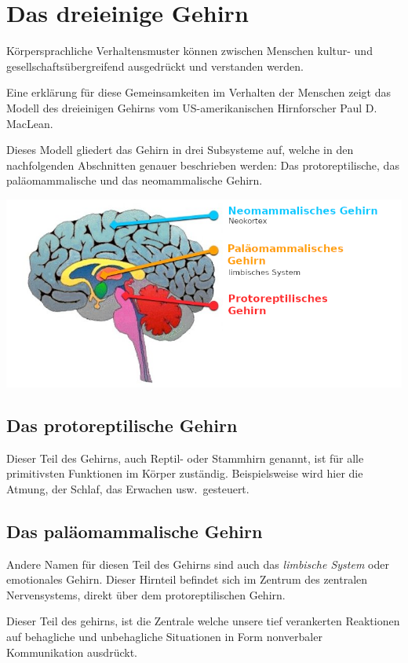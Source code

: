 \section{Das dreieinige Gehirn}\label{sec:das-dreieinige-gehirn}
Körpersprachliche Verhaltensmuster können zwischen Menschen kultur- und gesellschaftsübergreifend ausgedrückt und verstanden werden.

Eine erklärung für diese Gemeinsamkeiten im Verhalten der Menschen zeigt das Modell des dreieinigen Gehirns
vom US-amerikanischen Hirnforscher Paul D. MacLean.

Dieses Modell gliedert das Gehirn in drei Subsysteme auf, welche in den nachfolgenden Abschnitten genauer beschrieben werden:
Das protoreptilische, das paläomammalische und das neomammalische Gehirn.

\includegraphics[width=\textwidth]{images/brain}

\subsection{Das protoreptilische Gehirn}\label{subsec:das-protoreptilische-gehirn}

Dieser Teil des Gehirns, auch Reptil- oder Stammhirn genannt, ist für alle primitivsten Funktionen im Körper zuständig.
Beispielsweise wird hier die Atmung, der Schlaf, das Erwachen usw.\ gesteuert.

\subsection{Das paläomammalische Gehirn}\label{subsec:das-palaomammalische-gehirn}
Andere Namen für diesen Teil des Gehirns sind auch das \textit{limbische System} oder emotionales Gehirn.
Dieser Hirnteil befindet sich im Zentrum des zentralen Nervensystems, direkt über dem protoreptilischen Gehirn.

Dieser Teil des gehirns, ist die Zentrale welche unsere tief verankerten Reaktionen auf behagliche und unbehagliche
Situationen in Form nonverbaler Kommunikation ausdrückt.

